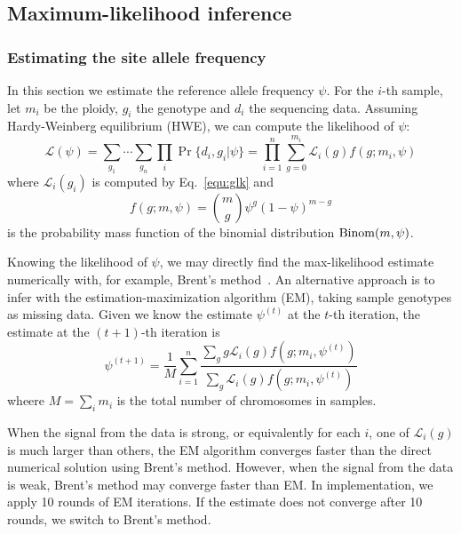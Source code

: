 \documentclass{bioinfo}
\begin{document}
\begin{methods}

\subsection{Maximum-likelihood inference}

\subsubsection{Estimating the site allele frequency}
In this section we estimate the reference allele frequency $\psi$.
For the $i$-th sample, let $m_i$ be the ploidy, $g_i$ 
the genotype and $d_i$ the sequencing data.
Assuming Hardy-Weinberg equilibrium (HWE), we can compute the likelihood of $\psi$:
\begin{equation}\label{equ:flk}
\mathcal{L}(\psi)=\sum_{g_1}\cdots\sum_{g_n}\prod_i\Pr\{d_i,g_i|\psi\}=\prod_{i=1}^n\sum_{g=0}^{m_i}\mathcal{L}_i(g)f(g;m_i,\psi)
\end{equation}
where $\mathcal{L}_i(g_i)$ is computed by Eq.~\eqref{equ:glk} and
\begin{equation}
f(g;m,\psi)=\binom{m}{g}\psi^g(1-\psi)^{m-g}
\end{equation}
is the probability mass function of the binomial distribution ${\rm Binom}(m,\psi)$.

Knowing the likelihood of $\psi$, we may directly find the max-likelihood estimate
numerically with, for example, Brent's method~\citep{Brent:1973kx}. An alternative approach is to 
infer with the estimation-maximization algorithm (EM), taking sample genotypes as missing data. Given
we know the estimate $\psi^{(t)}$ at the $t$-th iteration, the estimate at the $(t+1)$-th
iteration is
\begin{equation}
\psi^{(t+1)}=\frac{1}{M}\sum_{i=1}^n\frac{\sum_{g}g\mathcal{L}_i(g)f(g;m_i,\psi^{(t)})}{\sum_{g}\mathcal{L}_i(g)f(g;m_i,\psi^{(t)})}
\end{equation}
wheere $M=\sum_im_i$ is the total number of chromosomes in samples.

When the signal from the data is strong, or equivalently for each $i$, one of $\mathcal{L}_i(g)$
is much larger than others, the EM algorithm converges faster than the direct numerical
solution using Brent's method. However, when the signal from the data is weak,
Brent's method may converge faster than EM. In implementation, we apply 10 rounds of
EM iterations. If the estimate does not converge after 10 rounds, we switch to Brent's method.


\end{methods}
\end{document}
